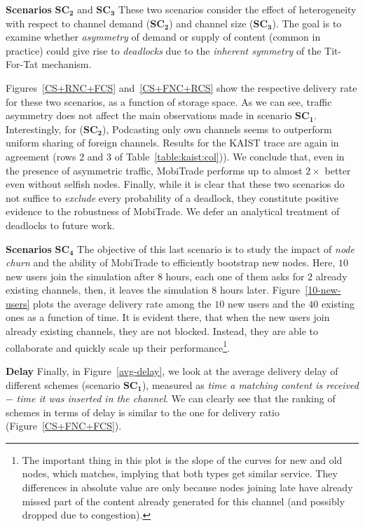 \textbf{Scenarios} $\mathbf{SC_{2}}$ and $\mathbf{SC_{3}}$ These two scenarios consider the effect of heterogeneity with respect to channel demand ($\mathbf{SC_{2}}$) and channel size ($\mathbf{SC_{3}}$). The goal is to examine whether \emph{asymmetry} of demand or supply of content (common in practice) could give rise to \emph{deadlocks} due to the \emph{inherent symmetry} of the Tit-For-Tat mechanism.

Figures~\ref{CS+RNC+FCS} and~\ref{CS+FNC+RCS} show the respective delivery rate for these two scenarios, as a function of storage space. As we can see, traffic asymmetry does not affect the main observations made in scenario $\mathbf{SC_{1}}$. Interestingly, for ($\mathbf{SC_{2}}$), Podcasting only own channels seems to outperform uniform sharing of foreign channels. Results for the KAIST trace are again in agreement (rows 2 and 3 of Table~\ref{table:kaist:col})). We conclude that, even in the presence of asymmetric traffic, MobiTrade performs up to almost $2\times$ better even without selfish nodes. Finally, while it is clear that these two scenarios do not suffice to \emph{exclude} every probability of a deadlock, they constitute positive evidence to the robustness of MobiTrade. We defer an analytical treatment of deadlocks to future work.

\textbf{Scenarios} $\mathbf{SC_{4}}$ The objective of this last scenario is to study the impact of \emph{node churn} and the ability of MobiTrade to efficiently bootstrap new nodes. Here, $10$ new users join the simulation after $8$ hours, each one of them asks for $2$ already existing channels, then, it leaves the simulation $8$ hours later. Figure~\ref{10-new-users} plots the average delivery rate among the $10$ new users and the $40$ existing ones as a function of time.
It is evident there, that when the new users join already existing channels, they are not blocked. Instead, they are able to collaborate and quickly scale up their performance\footnote{The important thing in this plot is the slope of the curves for new and old nodes, which matches, implying that both types get similar service. They differences in absolute value are only because nodes joining late have already missed part of the content already generated for this channel (and possibly dropped due to congestion).}.

\textbf{Delay} Finally, in Figure~\ref{avg-delay}, we look at the average delivery delay of different schemes (scenario $\mathbf{SC_{1}}$), measured as \emph{time a matching content is received} $-$ \emph{time it was inserted in the channel}. We can clearly see that the ranking of schemes in terms of delay is similar to the one for delivery ratio (Figure~\ref{CS+FNC+FCS}).

